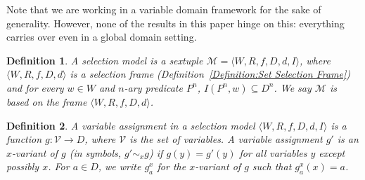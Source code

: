 \documentclass[12pt]{article}
\newtheorem{definition}{Definition}
\newcommand{\tup}[1]{\langle #1 \rangle}
\begin{document}
Note that we are working in a variable domain framework for the sake of generality. 
However, none of the results in this paper hinge on this: everything carries over even in a global domain setting. 

\begin{definition}
    \label{Definition:SelectionModel}
    A \emph{selection model} is a sextuple $\mathcal{M}=\tup{W,R,f,D,d,I}$, where $\tup{W,R,f,D,d}$ is a selection frame (Definition~\ref{Definition:Set Selection Frame}) and for every $w\in W$ and $n$-ary predicate $P^n$, $I(P^n,w)\subseteq D^n$. 
    We say $\mathcal{M}$ is \emph{based on} the frame $\tup{W,R,f,D,d}$. 
\end{definition}

\begin{definition}
    \label{Definition:VariableAssignment}
    A \emph{variable assignment} in a selection model $\tup{W,R,f,D,d,I}$ is a function $g:\mathcal{V}\to{D}$, where $\mathcal{V}$ is the set of variables. 
    A variable assignment $g'$ is an \emph{$x$-variant} of $g$ (in symbols, $g'\sim_{x}g$) if $g(y)=g'(y)$ for all variables $y$ except possibly $x$. 
    For $a\in D$, we write $g^x_a$ for the $x$-variant of $g$ such that $g^x_a(x) = a$. 
\end{definition}
\end{document}
